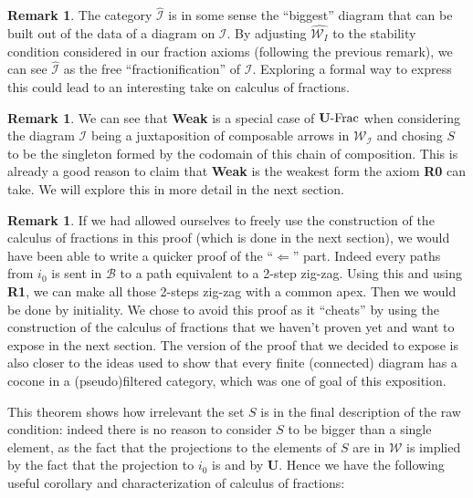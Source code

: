 \documentclass{article}
\numberwithin{equation}{section}
\theoremstyle{definition}
\newtheorem{remark}[equation]{Remark}
\theoremstyle{plain}
\begin{document}
\begin{remark}
	The category $\widehat{\mathcal{I}}$ is in some sense the ``biggest'' diagram that can be built out of the data of a diagram on $\mathcal{I}$. By adjusting $\widehat{\mathcal{W}_I}$ to the stability condition considered in our fraction axioms (following the previous remark), we can see $\widehat{\mathcal{I}}$ as the free ``fractionification'' of $\mathcal{I}$. Exploring a formal way to express this could lead to an interesting take on calculus of fractions.
\end{remark}

\begin{remark}
	We can see that \textbf{Weak} is a special case of $\textnormal{\textbf{U}-Frac}$ when considering the diagram $\mathcal{I}$ being a juxtaposition of composable arrows in $\mathcal{W}_{\mathcal{I}}$ and chosing $S$ to be the singleton formed by the codomain of this chain of composition. This is already a good reason to claim that \textbf{Weak} is the weakest form the axiom \textbf{R0} can take. We will explore this in more detail in the next section.
\end{remark}

\begin{remark}
	If we had allowed ourselves to freely use the construction of the calculus of fractions in this proof (which is done in the next section), we would have been able to write a quicker proof of the ``$\Leftarrow$'' part. Indeed every paths from $i_0$ is sent in $\mathcal{B}$ to a path equivalent to a 2-step zig-zag. Using this and using \textbf{R1}, we can make all those 2-steps zig-zag with a common apex. Then we would be done by initiality. We chose to avoid this proof as it ``cheats'' by using the construction of the calculus of fractions that we haven't proven yet and want to expose in the next section. The version of the proof that we decided to expose is also closer to the ideas used to show that every finite (connected) diagram has a cocone in a (pseudo)filtered category, which was one of goal of this exposition.
\end{remark}

This theorem shows how irrelevant the set $S$ is in the final description of the raw condition: indeed there is no reason to consider $S$ to be bigger than a single element, as the fact that the projections to the elements of $S$ are in $\mathcal{W}$ is implied by the fact that the projection to $i_0$ is and by \textbf{U}. Hence we have the following useful corollary and characterization of calculus of fractions:
\end{document}
